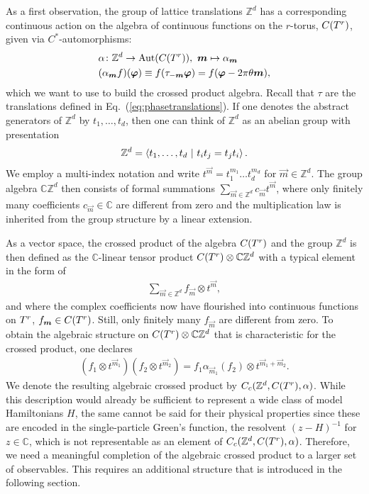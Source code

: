 \documentclass[submission, Phys]{SciPost}
\begin{document}
As a first observation, the group of lattice translations $\mathbb{Z}^d$ has a corresponding continuous action on the algebra of continuous functions on the $r$-torus, $C(T^r)$, given via $C^\ast$-au\-to\-mor\-phisms:
\begin{align}
    & \alpha \colon \mathbb{Z}^d \to \mathrm{Aut}( C(\hull) ), \ \vec{m} \mapsto \alpha_{\vec{m}}\\ 
    & (\alpha_{\vec{m}} f)(\vec{\varphi}) \equiv  f( \tau_{-\vec{m}}\vec{\varphi}) = f(\vec{\varphi} - 2\pi\theta\vec{m}),
\end{align}
which we want to use to build the crossed product algebra.
Recall that $\tau$ are the translations defined in Eq.~(\ref{eq:phasetranslations}).
If one denotes the abstract generators of $\mathbb{Z}^d$ by $t_1, \ldots, t_d$, then one can think of $\mathbb{Z}^d$ as an abelian group with presentation
\begin{align}
    \mathbb{Z}^d = \braket{ t_1, \ldots, t_d ~|~ t_i t_j = t_j t_i}.
\end{align}
We employ a multi-index notation and write $t^{\vec{m}} = t_1^{m_1} \ldots t_d^{m_d}$ for $\vec{m} \in \mathbb{Z}^d$.
The group algebra $\mathbb{C} \mathbb{Z}^d$ then consists of formal summations $\sum_{\vec{m} \in \mathbb{Z}^d} c_{\vec{m}} t^{\vec{m}}$, where only finitely many coefficients $c_{\vec{m}} \in \mathbb{C}$ are different from zero and the multiplication law is inherited from the group structure by a linear extension.

As a vector space, the crossed product of the algebra $C(T^r)$ and the group $\mathbb{Z}^d$ is then defined as the $\mathbb{C}$-linear tensor product $C(T^r) \otimes \mathbb{C}\mathbb{Z}^d$ with a typical element in the form of
\begin{align}
    \sum_{\vec{m} \in \mathbb{Z}^d} f_{\vec{m}} \otimes t^{\vec{m}} ,
\end{align}
and where the complex coefficients now have flourished into continuous functions on $T^r$, $f_{\boldsymbol{m}}\in C(T^r)$. Still, only finitely many $f_{\vec{m}}$ are different from zero.
To obtain the algebraic structure on $C(T^r) \otimes \mathbb{C}\mathbb{Z}^d$ that is characteristic for the crossed product, one declares 
\begin{align}
    (f_1 \otimes t^{\vec{m}_1} )  (f_2 \otimes t^{\vec{m}_2} )  = f_1 \alpha_{\vec{m}_1} ( f_2)  \otimes t^{\vec{m}_1 + \vec{m}_2}.
    \label{eq:crossed_product_multiplication}
\end{align}
We denote the resulting algebraic crossed product by $C_c(\mathbb{Z}^d, C(T^r), \alpha )$.
While this description would already be sufficient to represent a wide class of model Hamiltonians $H$, the same cannot be said for their physical properties since these are encoded in the single-particle Green's function, the resolvent $(z - H)^{-1}$ for $z \in \mathbb{C}$, which is not representable as an element of $C_c(\mathbb{Z}^d, C(T^r), \alpha )$.
Therefore, we need a meaningful completion of the algebraic crossed product to a larger set of observables.
This requires an additional structure that is introduced in the following section.
\end{document}
